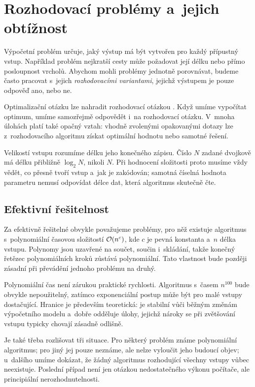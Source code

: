 \section{Rozhodovací problémy a~jejich obtížnost}\label{sec:rozhodovaci-obtiznost}

Výpočetní problém určuje, jaký výstup má být vytvořen pro každý přípustný vstup. Například problém nejkratší cesty může požadovat její délku nebo přímo posloupnost vrcholů. Abychom mohli problémy jednotně porovnávat, budeme často pracovat s~jejich \emph{rozhodovacími variantami}, jejichž výstupem je pouze odpověď ano, nebo ne.

Optimalizační otázku  lze nahradit rozhodovací otázkou . Když umíme vypočítat optimum, umíme samozřejmě odpovědět i~na rozhodovací otázku. V~mnoha úlohách platí také opačný vztah: vhodně zvolenými opakovanými dotazy lze z~rozhodovacího algoritmu získat optimální hodnotu nebo samotné řešení.

Velikostí vstupu rozumíme délku jeho konečného zápisu. Číslo \(N\) zadané dvojkově má délku přibližně \(\log_2N\), nikoli \(N\). Při hodnocení složitosti proto musíme vždy vědět, co přesně tvoří vstup a~jak je zakódován; samotná číselná hodnota parametru nemusí odpovídat délce dat, která algoritmus skutečně čte.

\subsection{Efektivní řešitelnost}

Za efektivně řešitelné obvykle považujeme problémy, pro něž existuje algoritmus s~polynomiální časovou složitostí \(\mathcal{O}(n^c)\), kde \(c\) je pevná konstanta a~\(n\) délka vstupu. Polynomy jsou uzavřené na součet, součin i~skládání, takže konečný řetězec polynomiálních kroků zůstává polynomiální. Tato vlastnost bude později zásadní při převádění jednoho problému na druhý.

Polynomiální čas není zárukou praktické rychlosti. Algoritmus s~časem \(n^{100}\) bude obvykle nepoužitelný, zatímco exponenciální postup může být pro malé vstupy dostačující. Hranice je především teoretická: je stabilní vůči běžným změnám výpočetního modelu a~dobře odděluje úlohy, jejichž nároky se při zvětšování vstupu typicky chovají zásadně odlišně.

Je také třeba rozlišovat tři situace. Pro některý problém známe polynomiální algoritmus; pro jiný jej pouze neznáme, ale nelze vyloučit jeho budoucí objev; u~dalšího umíme dokázat, že žádný algoritmus rozhodující všechny vstupy vůbec neexistuje. Poslední případ není jen otázkou nedostatečného výkonu počítače, ale principiální nerozhodnutelnosti.

